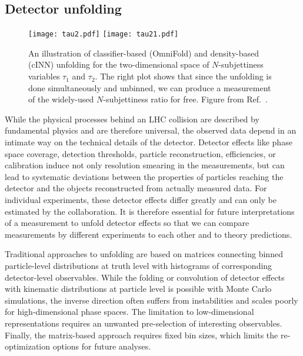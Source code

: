 \documentclass[submission,Phys]{SciPost}
\begin{document}
\subsection{Detector unfolding}
\label{sec:inverse_det}

\begin{figure}[t]
  \texttt{[image: tau2.pdf]}
  \texttt{[image: tau21.pdf]}
  \caption{An illustration of classifier-based (OmniFold) and density-based (cINN) unfolding for the two-dimensional space of $N$-subjettiness variables $\tau_1$ and $\tau_2$.  The right plot shows that since the unfolding is done simultaneously and unbinned, we can produce a measurement of the widely-used $N$-subjettiness ratio for free. Figure from Ref.~\cite{Arratia:2021otl}.}
  \label{fig:unfold}
\end{figure}

While the physical processes behind an LHC collision are described by fundamental physics and are therefore universal, the observed data depend in an intimate way on the technical details of the detector. Detector effects like phase space coverage, detection thresholds, particle reconstruction, efficiencies, or calibration induce not only resolution smearing in the measurements, but can lead to systematic deviations between the properties of particles reaching the detector and the objects reconstructed from actually measured data. For individual experiments, these detector effects differ greatly and can only be estimated by the collaboration. It is therefore essential for future interpretations of a measurement to unfold detector effects so that we can compare measurements by different experiments to each other and to theory predictions. 

Traditional approaches to unfolding are based on matrices connecting binned particle-level distributions at truth level with histograms of corresponding detector-level observables. While the folding or convolution of detector effects with kinematic distributions at particle level is possible with Monte Carlo simulations, the inverse direction often suffers from instabilities and scales poorly for high-dimensional phase spaces. The limitation to low-dimensional representations requires an unwanted  pre-selection of interesting observables. Finally, the matrix-based approach requires fixed bin sizes, which limits the re-optimization options for future analyses.
\end{document}
